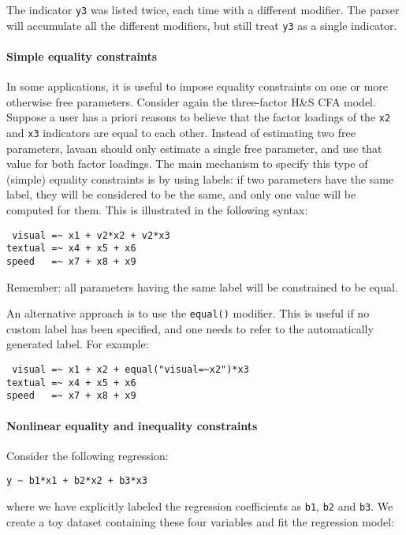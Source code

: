 The indicator \texttt{y3} was listed twice, each time with a different
modifier. The parser will accumulate all the different modifiers, but
still treat \texttt{y3} as a single indicator.

\paragraph{Simple equality constraints}

In some applications, it is useful to impose equality constraints on one
or more otherwise free parameters. Consider again the three-factor H\&S
CFA model. Suppose a user has a priori reasons to believe that the
factor loadings of the \texttt{x2} and \texttt{x3} indicators are equal
to each other. Instead of estimating two free parameters, lavaan should
only estimate a single free parameter, and use that value for both
factor loadings. The main mechanism to specify this type of (simple)
equality constraints is by using labels: if two parameters have the same
label, they will be considered to be the same, and only one value will
be computed for them. This is illustrated in the following syntax:

\begin{verbatim}
 visual =~ x1 + v2*x2 + v2*x3
textual =~ x4 + x5 + x6
speed   =~ x7 + x8 + x9
\end{verbatim}

Remember: all parameters having the same label will be constrained to be
equal.

An alternative approach is to use the \texttt{equal()} modifier. This is
useful if no custom label has been specified, and one needs to refer to
the automatically generated label. For example:

\begin{verbatim}
 visual =~ x1 + x2 + equal("visual=~x2")*x3
textual =~ x4 + x5 + x6
speed   =~ x7 + x8 + x9
\end{verbatim}

\paragraph{Nonlinear equality and inequality constraints}

Consider the following regression:

\begin{verbatim}
y ~ b1*x1 + b2*x2 + b3*x3
\end{verbatim}

where we have explicitly labeled the regression coefficients as
\texttt{b1}, \texttt{b2} and \texttt{b3}. We create a toy dataset
containing these four variables and fit the regression model:

